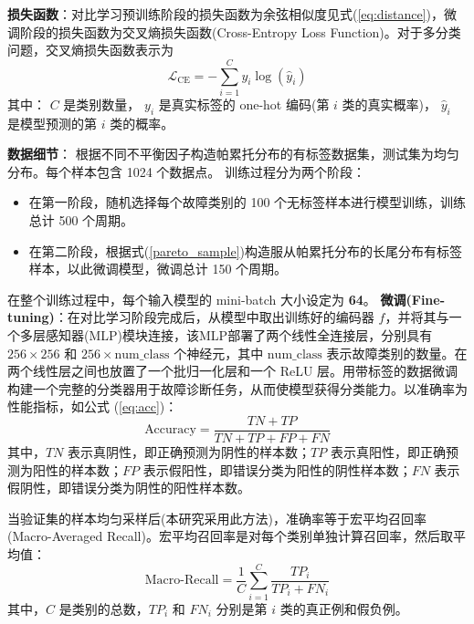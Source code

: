 \documentclass[master]{thesis-uestc}
\begin{document}
\textbf{损失函数}：对比学习预训练阶段的损失函数为余弦相似度见式(\ref{eq:distance})，微调阶段的损失函数为交叉熵损失函数(Cross-Entropy Loss Function)。对于多分类问题，交叉熵损失函数表示为
\begin{equation}
    \mathcal{L}_{\text{CE}} = -\sum_{i=1}^{C} y_i \log(\hat{y}_i)
    \label{eq:cross_entropy}
    \end{equation}        
    其中：
        \( C \) 是类别数量，
        \( y_i \) 是真实标签的 one-hot 编码(第 \( i \) 类的真实概率)，
        \( \hat{y}_i \) 是模型预测的第 \( i \) 类的概率。

\textbf{数据细节}：
根据不同不平衡因子构造帕累托分布的有标签数据集，测试集为均匀分布。每个样本包含 1024 个数据点。
    训练过程分为两个阶段：
    \begin{itemize}
        \item 在第一阶段，随机选择每个故障类别的 100 个无标签样本进行模型训练，训练总计 500 个周期。
        \item 在第二阶段，根据式(\ref{pareto_sample})构造服从帕累托分布的长尾分布有标签样本，以此微调模型，微调总计 150 个周期。
    \end{itemize}
    在整个训练过程中，每个输入模型的 mini-batch 大小设定为 \textbf{64}。
\textbf{微调(Fine-tuning)}：在对比学习阶段完成后，从模型中取出训练好的编码器 \( f \)，并将其与一个多层感知器(MLP)模块连接，该MLP部署了两个线性全连接层，分别具有 \( 256 \times 256 \) 和 \( 256 \times \text{num\_class} \) 个神经元，其中 \(\text{num\_class}\) 表示故障类别的数量。在两个线性层之间也放置了一个批归一化层和一个 ReLU 层。用带标签的数据微调构建一个完整的分类器用于故障诊断任务，从而使模型获得分类能力。以准确率为性能指标，如公式 (\ref{eq:acc})：
    \begin{equation}
        \text{Accuracy} = \frac{TN + TP}{TN + TP + FP + FN}
        \label{eq:acc}
    \end{equation}
    其中，\( TN \) 表示真阴性，即正确预测为阴性的样本数；\( TP \) 表示真阳性，即正确预测为阳性的样本数；\( FP \) 表示假阳性，即错误分类为阳性的阴性样本数；\( FN \) 表示假阴性，即错误分类为阴性的阳性样本数。
    
    当验证集的样本均匀采样后(本研究采用此方法)，准确率等于宏平均召回率(Macro-Averaged Recall)。宏平均召回率是对每个类别单独计算召回率，然后取平均值：
    \begin{equation}
        \text{Macro-Recall} = \frac{1}{C} \sum_{i=1}^{C} \frac{TP_i}{TP_i + FN_i}
        \label{eq:macro_recall}
    \end{equation}
    其中，\( C \) 是类别的总数，\( TP_i \) 和 \( FN_i \) 分别是第 \( i \) 类的真正例和假负例。
    
\end{document}
